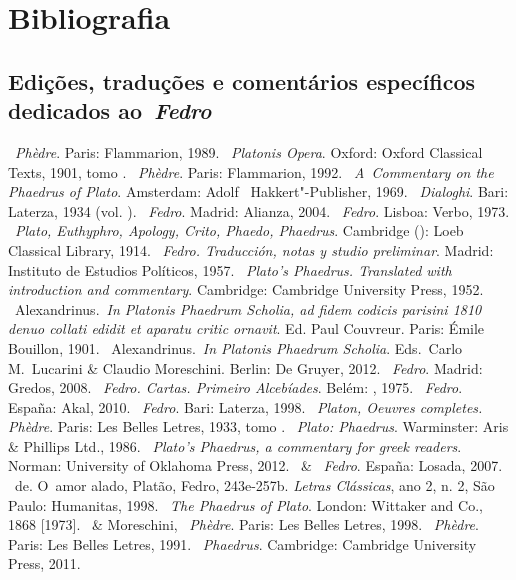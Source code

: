 \chapter{Bibliografia}

\section{Edições, traduções e comentários específicos dedicados
ao~\emph{Fedro}}

 

\begin{bibliohedra}
~\emph{Phèdre}. Paris: Flammarion, 1989.
~\emph{Platonis Opera}. Oxford: Oxford Classical
  Texts, 1901, tomo .
~\emph{Phèdre}. Paris: Flammarion, 1992.
~\emph{A~Commentary on the Phaedrus of Plato}.
  Amsterdam: Adolf ~Hakkert"-Publisher, 1969.
~\emph{Dialoghi}. Bari: Laterza, 1934 (vol. ).
~\emph{Fedro}. Madrid: Alianza, 2004.
~\emph{Fedro}. Lisboa: Verbo, 1973.
~\emph{Plato, Euthyphro, Apology, Crito, Phaedo, Phaedrus}. Cambridge (): Loeb
  Classical Library, 1914.
~\emph{Fedro. Traducción, notas y studio preliminar}.
  Madrid: Instituto de Estudios Políticos, 1957.
~\emph{Plato's Phaedrus. Translated with introduction
  and commentary}. Cambridge: Cambridge University Press, 1952.
~Alexandrinus.~\emph{In Platonis Phaedrum Scholia, ad fidem
  codicis parisini 1810 denuo collati edidit et aparatu critic ornavit}.
  Ed. Paul Couvreur. Paris: Émile Bouillon, 1901.
~Alexandrinus.~\emph{In Platonis Phaedrum Scholia}. Eds.~Carlo
  M.~Lucarini \& Claudio Moreschini. Berlin: De Gruyer,
  2012.
~\emph{Fedro}. Madrid: Gredos, 2008.
~\emph{Fedro. Cartas. Primeiro Alcebíades}.
  Belém: , 1975.
~\emph{Fedro}. España: Akal,
  2010.
~\emph{Fedro}. Bari: Laterza, 1998.
~\emph{Platon, Oeuvres completes. Phèdre}.
  Paris: Les Belles Letres, 1933, tomo .
~\emph{Plato: Phaedrus}. Warminster: Aris \& Phillips Ltd., 1986.
~\emph{Plato's Phaedrus, a commentary for greek readers}.
  Norman: University of Oklahoma Press, 2012.
~\& ~\emph{Fedro}. España: Losada, 2007.
~de. O~amor alado, Platão, Fedro, 243e-257b.
  \emph{Letras Clássicas}, ano 2, n. 2, São Paulo: Humanitas, 1998.
~\emph{The Phaedrus of Plato}. London: Wittaker and Co., 1868 [1973].
~\& Moreschini, ~\emph{Phèdre}. Paris: Les Belles Letres,
  1998.
~\emph{Phèdre}. Paris: Les Belles Letres, 1991.
~\emph{Phaedrus}. Cambridge:
  Cambridge University Press, 2011.
\end{bibliohedra}

